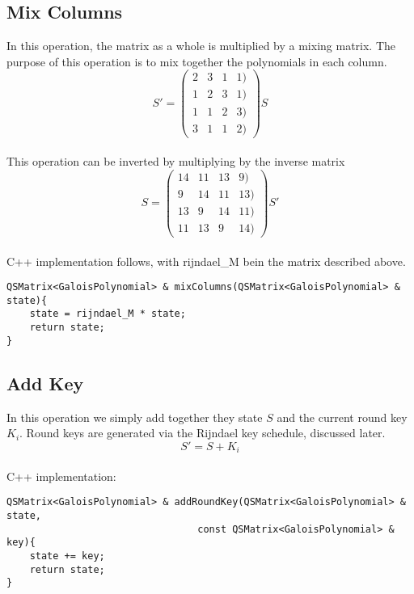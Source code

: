 \documentclass{article}
\begin{document}
\subsection{Mix Columns}

In this operation, the matrix as a whole is multiplied by a mixing matrix.  The purpose of this operation is to mix together the polynomials in each column.
\[ S' = \left( \begin{array}{cccc}
2 & 3 & 1 & 1) \\
1 & 2 & 3 & 1) \\
1 & 1 & 2 & 3) \\
3 & 1 & 1 & 2) \end{array} \right) S\] 
\hfill\\
This operation can be inverted by multiplying by the inverse matrix
\[ S = \left( \begin{array}{cccc}
14 & 11 & 13 & 9) \\
9 & 14 & 11 & 13) \\
13 & 9 & 14 & 11) \\
11 & 13 & 9 & 14) \end{array} \right) S'\]
\hfill\\
C++ implementation follows, with rijndael\_M bein the matrix described above.
\begin{lstlisting}
QSMatrix<GaloisPolynomial> & mixColumns(QSMatrix<GaloisPolynomial> & state){
    state = rijndael_M * state;
    return state;
}
\end{lstlisting}

\subsection{Add Key}

In this operation we simply add together they state $S$ and the current round key $K_i$.  Round keys are generated via the Rijndael key schedule, discussed later.
\[ S' = S + K_i \]
\hfill\\
C++ implementation:
\begin{lstlisting}
QSMatrix<GaloisPolynomial> & addRoundKey(QSMatrix<GaloisPolynomial> & state,
                                 const QSMatrix<GaloisPolynomial> & key){
    state += key;
    return state;
}
\end{lstlisting}
\end{document}
